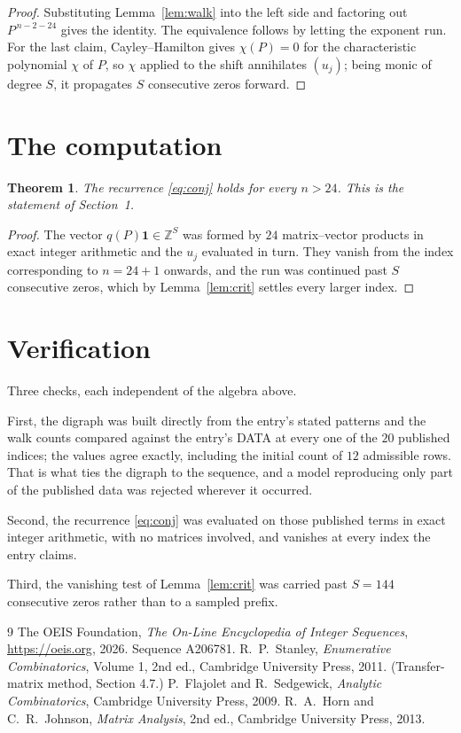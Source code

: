 \documentclass[11pt,a4paper]{article}
\theoremstyle{plain}
\newtheorem{theorem}{Theorem}
\theoremstyle{definition}
\begin{document}
\begin{proof}
Substituting Lemma~\ref{lem:walk} into the left side and factoring out
$P^{\,n-2-24}$ gives the identity. The equivalence follows by letting the exponent
run. For the last claim, Cayley--Hamilton gives $\chi(P)=0$ for the characteristic
polynomial $\chi$ of $P$, so $\chi$ applied to the shift annihilates $(u_j)$; being monic of
degree $S$, it propagates $S$ consecutive zeros forward.
\end{proof}

\section{The computation}

\begin{theorem}
The recurrence \eqref{eq:conj} holds for every $n>24$. This is the statement of
Section~1.
\end{theorem}

\begin{proof}
The vector $q(P)\mathbf{1}\in\mathbb{Z}^{S}$ was formed by $24$ matrix--vector
products in exact integer arithmetic and the $u_j$ evaluated in turn. They vanish from the
index corresponding to $n=24+1$ onwards, and the run was continued past $S$ consecutive
zeros, which by Lemma~\ref{lem:crit} settles every larger index.
\end{proof}

\section{Verification}

Three checks, each independent of the algebra above.

First, the digraph was built directly from the entry's stated patterns and the walk counts
compared against the entry's DATA at every one of the $20$ published indices; the
values agree exactly, including the initial count of $12$ admissible rows. That is
what ties the digraph to the sequence, and a model reproducing only part of the published
data was rejected wherever it occurred.

Second, the recurrence \eqref{eq:conj} was evaluated on those published terms in exact
integer arithmetic, with no matrices involved, and vanishes at every index the entry claims.

Third, the vanishing test of Lemma~\ref{lem:crit} was carried past $S=144$ consecutive
zeros rather than to a sampled prefix.

\begin{thebibliography}{9}
 The OEIS Foundation, \emph{The On-Line Encyclopedia of Integer
Sequences}, \url{https://oeis.org}, 2026. Sequence A206781.
 R.~P.~Stanley, \emph{Enumerative Combinatorics}, Volume 1, 2nd ed.,
Cambridge University Press, 2011. (Transfer-matrix method, Section 4.7.)
 P.~Flajolet and R.~Sedgewick, \emph{Analytic Combinatorics}, Cambridge
University Press, 2009.
 R.~A.~Horn and C.~R.~Johnson, \emph{Matrix Analysis}, 2nd ed., Cambridge
University Press, 2013.
\end{thebibliography}
\end{document}

